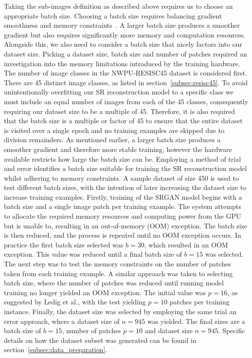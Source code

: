Taking the sub-images definition as described above requires us to choose an appropriate batch size. Choosing a batch size requires balancing gradient smoothness and memory constraints~\cite{ref}. A larger batch size produces a smoother gradient but also requires significantly more memory and computation resources. Alongside this, we also need to consider a batch size that nicely factors into our dataset size. Picking a dataset size, batch size and number of patches required an investigation into the memory limitations introduced by the training hardware. The number of image classes in the NWPU-RESISC45 dataset is considered first. There are 45 distinct image classes, as listed in section~\ref{subsec:resisc45}. To avoid unintentionally overfitting our SR reconstruction model to a specific class we must include an equal number of images from each of the 45 classes, consequently requiring our dataset size to be a multiple of 45. Therefore, it is also required that the batch size is a multiple or factor of 45 to ensure that the entire dataset is visited over a single epoch and no training examples are skipped due to division remainders. As mentioned earlier, a larger batch size produces a smoother gradient and therefore more stable training, however the hardware available restricts how large the batch size can be. Employing a method of trial and error identifies a batch size suitable for training the SR reconstruction model whilst adhering to memory constraints. A sample dataset of size 450 is used to test different batch sizes, with the intention of later increasing the dataset size to increase training examples. Firstly, training of the SRGAN model begins with a batch size and a single image patch per training example. The system attempts to allocate the required memory resources and computing power from the GPU but is unable to, resulting in an out-of-memory (OOM) exception. The batch size is then reduced, and the process is repeated until no OOM exception occurs. In practice the first batch size selected was $b = 30$, which resulted in an OOM exception. This value was reduced until a final batch size of $b = 15$ was selected. The next step was to test the memory constraints on the number of patches taken from each training example. A similar approach was taken to selecting batch size, where the number of patches was reduced until running model training no longer yielded an OOM exception. The initial value was $p = 16$, as suggested by Ledig et al., with the test yielding $p = 10$ patches per training instance. Finally, the dataset size was selected by employing the same trial an error approach, where a dataset size of $n = 945$ was yielded. The final sizes are a batch size of $b = 15$, number of patches $p = 10$ and dataset size $n = 945$. Specific details on how the dataset subset was generated can be found in section~\ref{subsec:data_preparation}.

